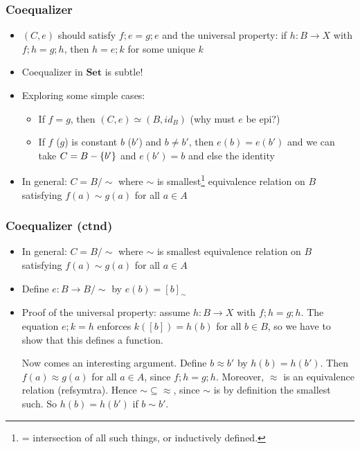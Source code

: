 \documentclass[handout]{beamer}
\newcommand{\bfsf}[1]{{\boldsymbol{#1}}}
\newcommand{\Set}{\bfsf{Set}}
\begin{document}
\frame
  {   
    \frametitle{Coequalizer}\label{Ch4:CoEqSet}

 \begin{itemize}[<+->]
\item $(C,e)$ should satisfy $f;e=g;e$ and the universal property:
if $h: B\to X$ with $f;h=g;h$, then $h=e;k$ for some unique $k$
\item Coequalizer in $\Set$ is subtle!
\item Exploring some simple cases:
 \begin{itemize}
\item If $f=g$, then $(C,e)\simeq(B,id_B)$ (why must $e$ be epi?)
\item If $f$ ($g$) is constant $b$ ($b'$) and  $b\neq b'$, then $e(b)=e(b')$
and we can take $C = B-\{b'\}$ and $e(b')=b$ and else the identity
\end{itemize}
\item In general: $C=B/{\sim}$ where $\sim$ is smallest\footnote{%
= intersection of all such things, or inductively defined.}
 equivalence relation
 on $B$ satisfying $f(a)\sim g(a)$ for all $a\in A$
\end{itemize}

}

\frame
  {   
    \frametitle{Coequalizer (ctnd)}\label{Ch4:CoEqSetCtnd}

 \begin{itemize}[<+->]
\item In general: $C=B/{\sim}$ where $\sim$ is smallest equivalence relation
 on $B$ satisfying $f(a)\sim g(a)$ for all $a\in A$
\item Define $e: B \to B/{\sim}$ by $e(b)= [b]_{\sim}$
\item Proof of the universal property: assume $h:B\to X$ with $f;h=g;h$.
The equation $e;k = h$ enforces $k([b]) = h(b)$ for all $b\in B$, so we have
to show that this defines a function. 
\vspace*{2mm}

Now comes an interesting argument.
Define $b\approx b'$ by $h(b)=h(b')$.
Then $f(a)\approx g(a)$ for all $a\in A$, since $f;h=g;h$.
Moreover, $\approx$ is an equivalence relation (refsymtra).
Hence ${\sim}\subseteq{\approx}$, since $\sim$ is by definition the smallest such.
So $h(b)=h(b')$ if $b\sim b'$.

\end{itemize}

}
\end{document}
